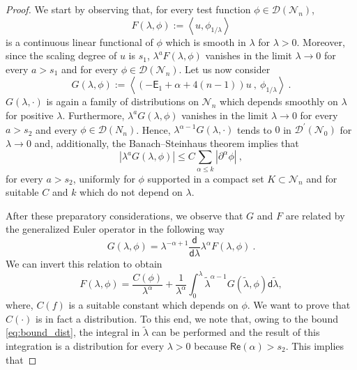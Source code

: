 \documentclass[11pt]{book}
\renewcommand{\Re}{\mathsf{Re}}
\newcommand{\abs}[1]{\left|#1\right|}
\newcommand{\sm}[1]{\left\langle#1\right\rangle}
\newcommand{\Dcal}{\mathcal{D}}
\newcommand{\Ncal}{\mathcal{N}}
\newcommand{\Esf}{\mathsf{E}}
\newcommand{\dsf}{\mathsf{d}}
\theoremstyle{break}
\begin{document}
\begin{proof}
We start by observing that, for every test function $\phi\in\Dcal(\Ncal_n)$, 
%
\begin{equation*}
F(\lambda, \phi) := \sm{ u, \phi_{1/\lambda} } 
\end{equation*}
% 
is a continuous linear functional of $\phi$ which is smooth in $\lambda$ for $\lambda>0$. Moreover, since the scaling degree of $u$ is $s_1$, $\lambda^{a} F(\lambda, \phi)$ vanishes in the limit $\lambda \to 0$ for every $a > s_1$ and for every $\phi\in\Dcal(\Ncal_n)$. Let us now consider 
%
\begin{equation*}
G(\lambda, \phi) :=  \sm{\left(- \Esf_1+\alpha+4(n-1)\right) u \ , \ \phi_{1/\lambda} } \ .
\end{equation*}
%
$G(\lambda, \cdot)$ is again a family of distributions on $\Ncal_n$ which depends smoothly on $\lambda$ for positive $\lambda$. Furthermore, $\lambda^a G(\lambda, \phi)$ vanishes in the limit $\lambda \to 0$ for every $a > s_2$ and every $\phi\in\Dcal(N_n)$. Hence, $\lambda^{\alpha-1} G(\lambda, \cdot)$ tends to $0$ in $\Dcal^\prime(\Ncal_0)$ for $\lambda\to 0$ and, additionally, the Banach--Steinhaus theorem \cite{bourbaki_topological_1987} implies that 
%
\begin{equation}
\abs{ \lambda^a G(\lambda,\phi) }  \leq C \sum_{\alpha\leq k} \abs{\partial^{\alpha} \phi} \ ,
\label{eq:bound_dist}
\end{equation}
%
for every $a>s_2$, uniformly for $\phi$ supported in a compact set $K\subset \Ncal_n$ and for suitable $C$ and $k$ which do not depend on $\lambda$.\par%
%
After these preparatory considerations, we observe that $G$ and $F$ are related by the generalized Euler operator in the following way
%
\begin{equation*}
G(\lambda, \phi) =  \lambda^{-\alpha+1} \frac{\dsf}{\dsf\lambda} \lambda^{\alpha} F(\lambda, \phi) \ . 
\end{equation*}
%
We can invert this relation to obtain
%
\begin{equation*}
F(\lambda, \phi) =  \frac{C(\phi)}{\lambda^{\alpha}} + \frac{1}{\lambda^\alpha} \int_0^\lambda  \tilde{\lambda}^{\alpha-1} G(\tilde{\lambda}, \phi) \dsf\tilde{\lambda}, 
\end{equation*}
%
where, $C(f)$ is a suitable constant which depends on $\phi$. We want to prove that $C(\cdot)$ is in fact a distribution. To this end, we note that, owing to the bound \eqref{eq:bound_dist}, the integral in $\tilde\lambda$ can be performed and the result of this integration is a distribution for every $\lambda > 0$ because $\Re(\alpha) > s_2$. This implies that 

\end{proof}
\end{document}
